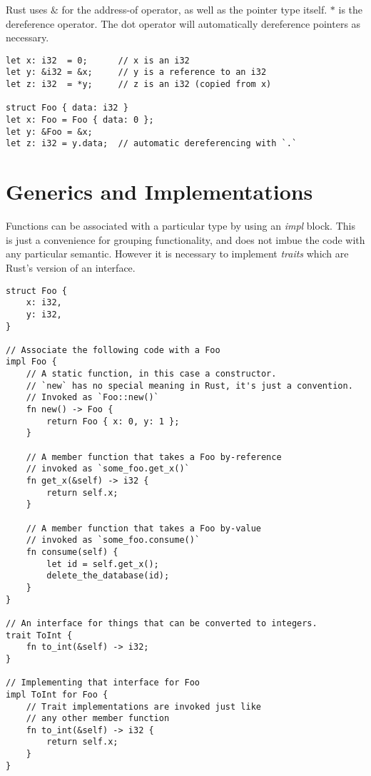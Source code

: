 Rust uses $\&$ for the address-of operator, as well as the pointer type
itself. $*$ is the dereference operator. The dot operator will automatically
dereference pointers as necessary.

\begin{verbatim}
let x: i32  = 0;      // x is an i32
let y: &i32 = &x;     // y is a reference to an i32
let z: i32  = *y;     // z is an i32 (copied from x)

struct Foo { data: i32 }
let x: Foo = Foo { data: 0 };
let y: &Foo = &x;
let z: i32 = y.data;  // automatic dereferencing with `.`

\end{verbatim}





\section{Generics and Implementations}

Functions can be associated with a particular type by using an \emph{impl}
block. This is just a convenience for grouping functionality, and does not
imbue the code with any particular semantic. However it is necessary to
implement \emph{traits} which are Rust's version of an interface.

\begin{verbatim}
struct Foo {
    x: i32,
    y: i32,
}

// Associate the following code with a Foo
impl Foo {
    // A static function, in this case a constructor.
    // `new` has no special meaning in Rust, it's just a convention.
    // Invoked as `Foo::new()`
    fn new() -> Foo {
        return Foo { x: 0, y: 1 };
    }

    // A member function that takes a Foo by-reference
    // invoked as `some_foo.get_x()`
    fn get_x(&self) -> i32 {
        return self.x;
    }

    // A member function that takes a Foo by-value
    // invoked as `some_foo.consume()`
    fn consume(self) {
        let id = self.get_x();
        delete_the_database(id);
    }
}

// An interface for things that can be converted to integers.
trait ToInt {
    fn to_int(&self) -> i32;
}

// Implementing that interface for Foo
impl ToInt for Foo {
    // Trait implementations are invoked just like
    // any other member function
    fn to_int(&self) -> i32 {
        return self.x;
    }
}
\end{verbatim}



